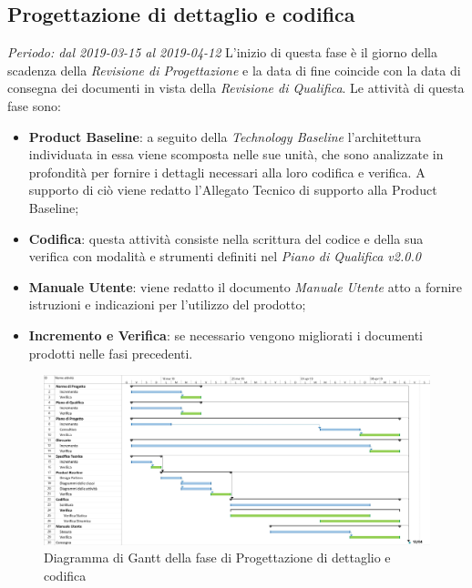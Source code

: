 \subsection{Progettazione di dettaglio e codifica}
\textit{Periodo: dal 2019-03-15 al 2019-04-12}
L'inizio di questa fase è il giorno della scadenza della \textit{Revisione di 
Progettazione} e la data di fine coincide con la data di consegna dei documenti 
in vista della \textit{Revisione di Qualifica}. Le attività di questa fase sono:
\begin{itemize}
	\item \textbf{Product Baseline}: a seguito della \textit{Technology 
	Baseline} l'architettura individuata in essa viene scomposta nelle sue unità,
	che sono analizzate in profondità per fornire i 
	dettagli necessari alla loro codifica e verifica. A supporto 
	di ciò viene redatto l'Allegato Tecnico di supporto alla Product Baseline;
	\item \textbf{Codifica}: questa attività consiste nella scrittura del 
	codice e della sua verifica con modalità e strumenti definiti nel 
	\textit{Piano di Qualifica v2.0.0}
	\item \textbf{Manuale Utente}: viene redatto il documento \textit{Manuale 
	Utente} atto a fornire istruzioni e indicazioni per l'utilizzo del prodotto;
	\item \textbf{Incremento e Verifica}: se necessario vengono migliorati i 
	documenti prodotti nelle fasi precedenti.
\end{itemize}

\begin{figure}[H]
	\includegraphics[width=0.99\linewidth]{res/images/gantt_pd.jpg}
	\caption{Diagramma di Gantt della fase di Progettazione di dettaglio e codifica}
\end{figure}
\pagebreak


